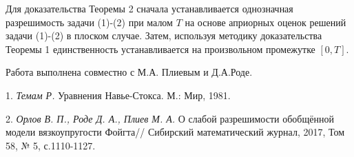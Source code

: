 Для доказательства Теоремы 2 сначала устанавливается однозначная разрешимость задачи  (1)-(2) при малом  $T$  на основе априорных оценок решений задачи  (1)-(2) в плоском случае. Затем, используя методику доказательства  Теоремы 1 единственность  устанавливается на произвольном промежутке $[0,T]$.



Работа выполнена совместно с М.А. Плиевым и Д.А.Роде.

\litlist

1. {\it Темам Р.}  Уравнения Навье-Стокса. М.: Мир,  1981.

2. {\it Орлов В. П.,  Роде Д. А., Плиев М. А.} О слабой разрешимости обобщённой
модели вязкоупругости  Фойгта// Сибирский математический журнал, 2017, Том 58, № 5, с.1110-1127.
